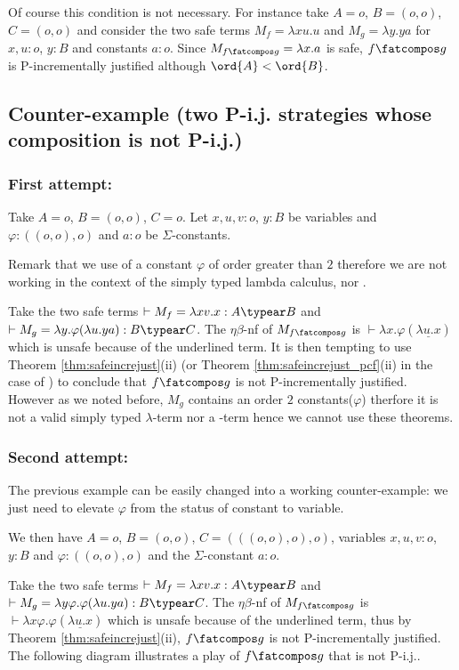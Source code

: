 Of course this condition is not necessary. For instance take $A=o$, $B=(o,o)$, $C=(o,o)$ and consider the two safe terms $M_f = \lambda x u.u$ and $M_g = \lambda y . y a$ for $x,u:o$, $y:B$ and constants $a:o$. Since $M_{f\fatcompos g} = \lambda x . a$ is safe, $f\fatcompos g$ is P-incrementally justified although $\ord{A} < \ord{B}$.





\subsection{Counter-example (two P-i.j. strategies whose composition is not P-i.j.)}
\subsubsection{First attempt:}

Take $A=o$, $B=(o,o)$, $C=o$. Let $x,u,v:o$, $y:B$ be variables and $\varphi:((o,o),o)$ and $a:o$ be $\Sigma$-constants.

Remark that we use of a constant $\varphi$ of order greater than $2$ therefore we are not working in the context of the simply typed lambda calculus, nor \pcf.

Take the two safe terms $\vdash  M_f = \lambda xv.x : A\typear B$ and $\vdash M_g = \lambda y . \varphi (\lambda u . y a) : B\typear C$.
The $\eta\beta$-nf of $M_{f\fatcompos g}$ is $\vdash \lambda x . \varphi (\underline{\lambda u . x})$ which is unsafe because of the underlined term. It is then tempting to use
Theorem \ref{thm:safeincrejust}(ii) (or Theorem \ref{thm:safeincrejust_pcf}(ii) in the case of \pcf) to conclude that
$f\fatcompos g$ is not P-incrementally justified. However as we noted before, $M_g$ contains an order $2$ constants($\varphi$) therfore it is not a valid simply typed $\lambda$-term nor a \pcf-term hence we cannot use these theorems.

\subsubsection{Second attempt:}
The previous example can be easily changed into a working counter-example: we just need to elevate $\varphi$ from the status of constant to variable.

We then have $A=o$, $B=(o,o)$, $C=(((o,o),o),o)$, variables
$x,u,v:o$, $y:B$ and $\varphi:((o,o),o)$ and the $\Sigma$-constant $a:o$.

Take the two safe terms $\vdash  M_f = \lambda xv.x : A\typear B$ and  $\vdash M_g = \lambda y \varphi. \varphi (\lambda u . y a) : B\typear C$.
The $\eta\beta$-nf of $M_{f\fatcompos g}$ is $\vdash \lambda x \varphi. \varphi (\underline{\lambda u . x})$ which is unsafe because of the underlined term, thus by Theorem \ref{thm:safeincrejust}(ii), $f\fatcompos g$ is not P-incrementally justified. The following diagram illustrates  a play of $f\fatcompos g$ that is not P-i.j..

